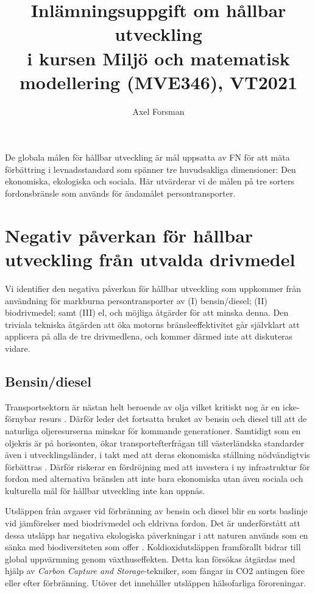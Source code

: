 \documentclass{article}
\title{Inlämningsuppgift om hållbar utveckling\\ i kursen Miljö och matematisk modellering (MVE346), VT2021}
\author{Axel Forsman}
\begin{document}
\maketitle

De globala målen för hållbar utveckling är mål uppsatta av FN
för att mäta förbättring i levnadsstandard
som spänner tre huvudsakliga dimensioner: Den ekonomiska, ekologiska och sociala.
Här utvärderar vi de målen på tre sorters fordonsbränsle som används
för ändamålet persontransporter.

\section{Negativ påverkan för hållbar utveckling från utvalda drivmedel}

Vi identifier den negativa påverkan för hållbar utveckling
som uppkommer från användning för markburna persontransporter av
(I) bensin/diesel; (II) biodrivmedel; samt (III) el,
och möjliga åtgärder för att minska denna.
Den triviala tekniska åtgärden att öka motorns bränsleeffektivitet
går självklart att applicera på alla de tre drivmedlena,
och kommer därmed inte att diskuteras vidare. 

\subsection{Bensin/diesel}

Transportsektorn är nästan helt beroende av olja vilket kritiskt nog är
en icke-förnybar resurs \autocite{gudmundsson96}.
Därför leder det fortsatta bruket av bensin och diesel till att
de naturliga oljeresurserna minskar för kommande generationer.
Samtidigt som en oljekris är på horisonten, ökar transportefterfrågan
till västerländska standarder även i utvecklingsländer,
i takt med att deras ekonomiska ställning nödvändigtvis förbättras \autocite{edenhofer15}.
Därför riskerar en fördröjning med att investera i ny infrastruktur för
fordon med alternativa bränslen
att inte bara ekonomiska utan även sociala och kulturella mål
för hållbar utveckling inte kan uppnås.

Utsläppen från avgaser vid förbränning av bensin och diesel
blir en sorts baslinje vid jämförelser med biodrivmedel och eldrivna fordon.
Det är underförstått att dessa utsläpp har negativa ekologiska påverkningar
i att naturen används som en sänka med biodiversiteten som offer \autocite{gudmundsson96}.
Koldioxidutsläppen framförallt bidrar till global uppvärmning \autocite{edenhofer15, xu19} genom växthuseffekten.
Detta kan försökas åtgärdas med hjälp av \emph{Carbon Capture and Storage}-tekniker,
som fångar in CO2 antingen före eller efter förbränning.
Utöver det innehåller utsläppen hälsofarliga föroreningar.
\end{document}
